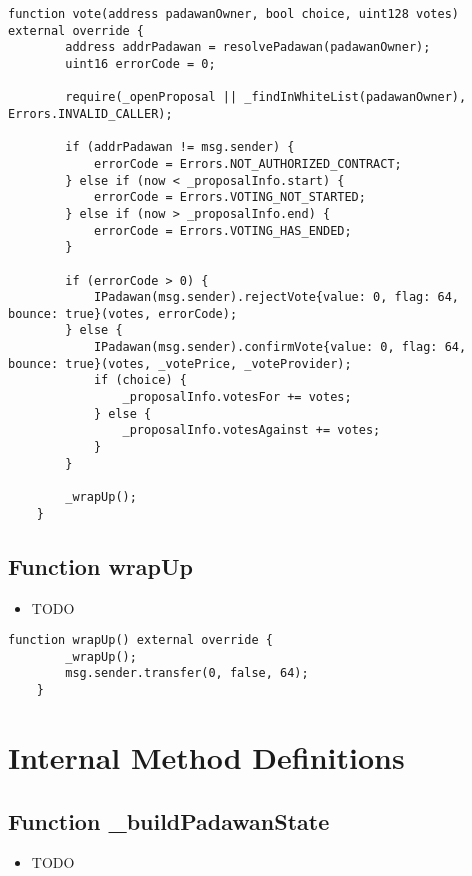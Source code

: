 \begin{lstlisting}[firstnumber=84]
    function vote(address padawanOwner, bool choice, uint128 votes) external override {
        address addrPadawan = resolvePadawan(padawanOwner);
        uint16 errorCode = 0;

        require(_openProposal || _findInWhiteList(padawanOwner), Errors.INVALID_CALLER);

        if (addrPadawan != msg.sender) {
            errorCode = Errors.NOT_AUTHORIZED_CONTRACT;
        } else if (now < _proposalInfo.start) {
            errorCode = Errors.VOTING_NOT_STARTED;
        } else if (now > _proposalInfo.end) {
            errorCode = Errors.VOTING_HAS_ENDED;
        }

        if (errorCode > 0) {
            IPadawan(msg.sender).rejectVote{value: 0, flag: 64, bounce: true}(votes, errorCode);
        } else {
            IPadawan(msg.sender).confirmVote{value: 0, flag: 64, bounce: true}(votes, _votePrice, _voteProvider);
            if (choice) {
                _proposalInfo.votesFor += votes;
            } else {
                _proposalInfo.votesAgainst += votes;
            }
        }

        _wrapUp();
    }
\end{lstlisting}

\subsection{Function wrapUp}

\begin{itemize}
\item TODO
\end{itemize}

\begin{lstlisting}[firstnumber=73]
    function wrapUp() external override {
        _wrapUp();
        msg.sender.transfer(0, false, 64);
    }
\end{lstlisting}

\section{Internal Method Definitions}


\subsection{Function \_{}buildPadawanState}

\begin{itemize}
\item TODO
\end{itemize}

